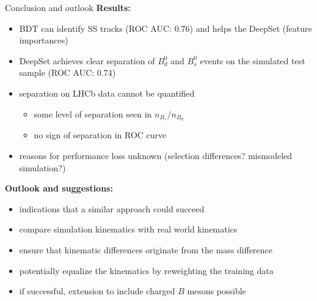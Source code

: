 \documentclass[aspectratio=1610, 10pt]{beamer}
\begin{document}
\begin{frame}{Conclusion and outlook}
  \textbf{Results:}
  \begin{itemize}
    \item BDT can identify SS tracks (ROC AUC: 0.76) and helps the DeepSet (feature importances)
    \item DeepSet achieves clear separation of $B^0_d$ and $B^0_s$ events on the simulated test sample (ROC AUC: 0.74)
    \item separation on LHCb data cannot be quantified
    \begin{itemize}
      \item some level of separation seen in $n_{B_s}/n_{B_d}$
      \item no sign of separation in ROC curve
    \end{itemize}
    \item reasons for performance loss unknown (selection differences? mismodeled simulation?)
  \end{itemize}
  
  \pause
  \medskip
  \textbf{Outlook and suggestions:}
  \begin{itemize}
    \item indications that a similar approach could succeed
    \item compare simulation kinematics with real world kinematics
    \item ensure that kinematic differences originate from the mass difference
    \item potentially equalize the kinematics by reweighting the training data
    \item if successful, extension to include charged $B$ mesons possible
  \end{itemize}
\end{frame}

\appendix
\end{document}
